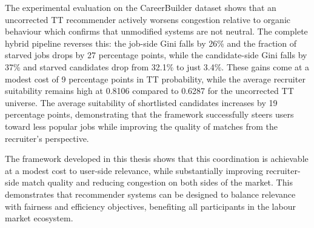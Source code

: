 The experimental evaluation on the CareerBuilder dataset shows that an 
uncorrected \gls{TT} recommender actively worsens congestion relative to 
organic behaviour which confirms that unmodified systems are not neutral. The 
complete hybrid pipeline reverses this: the job-side Gini falls by 26\% and 
the fraction of starved jobs drops by 27 percentage points, while the 
candidate-side Gini falls by 37\% and starved candidates drop from 32.1\% to 
just 3.4\%. These gains come at a modest cost of 9 percentage points in 
\gls{TT} probability, while the average recruiter suitability remains high 
at 0.8106 compared to 0.6287 for the uncorrected \gls{TT} universe. The average suitability of shortlisted candidates increases by 19 percentage points, demonstrating that the framework successfully steers users toward less popular jobs while improving the quality of matches from the recruiter's perspective.

The framework developed in this thesis shows that this coordination is achievable at a modest cost to user-side relevance, while substantially improving recruiter-side match quality and reducing congestion on both sides of the market. This demonstrates that recommender systems can be designed to balance relevance with fairness and efficiency objectives, benefiting all participants in the labour market ecosystem.
